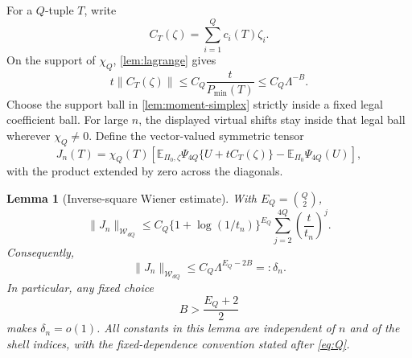 \documentclass[11pt]{article}
\newtheorem{lemma}[lemma]{Lemma}
\newcommand{\E}{\mathbb{E}}
\newcommand{\cW}{\mathcal{W}}
\newcommand{\norm}[1]{\lVert #1\rVert}
\begin{document}
For a \(Q\)-tuple \(T\), write
\[
 C_T(\zeta)=\sum_{i=1}^Qc_i(T)\zeta_i.
\]
On the support of \(\chi_Q\), \cref{lem:lagrange} gives
\[
 t\norm{C_T(\zeta)}\le C_Q\frac{t}{P_{\min}(T)}
 \le C_Q\Lambda^{-B}.
\]
Choose the support ball in \cref{lem:moment-simplex} strictly inside a fixed
legal coefficient ball.  For large \(n\), the displayed virtual shifts stay
inside that legal ball wherever \(\chi_Q\ne0\).  Define the vector-valued
symmetric tensor
\begin{equation}
 J_n(T)=\chi_Q(T)
 \left[
 \E_{\Pi_0,\zeta}\Psi_{4Q}\{U+tC_T(\zeta)\}
 -\E_{\Pi_0}\Psi_{4Q}(U)
 \right],
 \label{B:eq:ideal-increment}
\end{equation}
with the product extended by zero across the diagonals.
\begin{lemma}[Inverse-square Wiener estimate]
\label{B:lem:wiener-increment}
With \(E_Q=\binom Q2\),
\begin{equation}
 \norm{J_n}_{\cW_{dQ}}
 \le C_Q\{1+\log(1/t_n)\}^{E_Q}
       \sum_{j=2}^{4Q}\left(\frac{t}{t_n}\right)^j.
 \label{B:eq:wiener-increment-strong}
\end{equation}
Consequently,
\begin{equation}
 \norm{J_n}_{\cW_{dQ}}
 \le C_Q\Lambda^{E_Q-2B}=:\delta_n.
 \label{B:eq:wiener-increment}
\end{equation}
In particular, any fixed choice
\begin{equation}
 B>\frac{E_Q+2}{2}
 \label{B:eq:B-choice}
\end{equation}
makes \(\delta_n=o(1)\).  All constants in this lemma are independent of
\(n\) and of the shell indices, with the fixed-dependence convention stated
after \eqref{eq:Q}.
\end{lemma}
\end{document}
